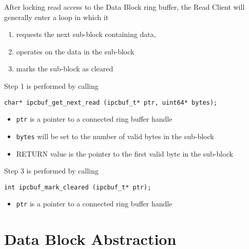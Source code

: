 After locking read access to the Data Block ring buffer, the Read Client
will generally enter a loop in which it
\begin{enumerate}
\item requests the next sub-block containing data, 
\vspace{-2mm}
\item operates on the data in the sub-block
\vspace{-2mm}
\item marks the sub-block as cleared
\end{enumerate}
Step 1 is performed by calling
\begin{verbatim}
char* ipcbuf_get_next_read (ipcbuf_t* ptr, uint64* bytes);
\end{verbatim}
\vspace{-6mm}
\begin{itemize}
\item {\tt ptr} is a pointer to a connected ring buffer handle
\vspace{-2mm}
\item {\tt bytes} will be set to the number of valid bytes in the sub-block
\vspace{-2mm}
\item RETURN value is the pointer to the first valid byte in the sub-block
\end{itemize}
Step 3 is performed by calling
\begin{verbatim}
int ipcbuf_mark_cleared (ipcbuf_t* ptr);
\end{verbatim}
\vspace{-6mm}
\begin{itemize}
\item {\tt ptr} is a pointer to a connected ring buffer handle
\end{itemize}


\section{Data Block Abstraction}

